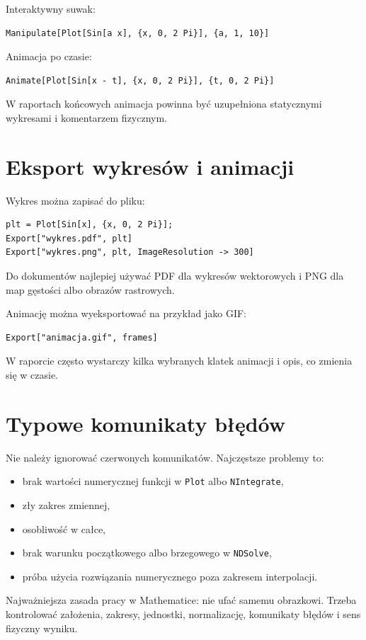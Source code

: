 Interaktywny suwak:
\begin{verbatim}
Manipulate[Plot[Sin[a x], {x, 0, 2 Pi}], {a, 1, 10}]
\end{verbatim}
Animacja po czasie:
\begin{verbatim}
Animate[Plot[Sin[x - t], {x, 0, 2 Pi}], {t, 0, 2 Pi}]
\end{verbatim}
W raportach końcowych animacja powinna być uzupełniona statycznymi wykresami i komentarzem fizycznym.

\section{Eksport wykresów i animacji}

Wykres można zapisać do pliku:
\begin{verbatim}
plt = Plot[Sin[x], {x, 0, 2 Pi}];
Export["wykres.pdf", plt]
Export["wykres.png", plt, ImageResolution -> 300]
\end{verbatim}
Do dokumentów najlepiej używać PDF dla wykresów wektorowych i PNG dla map gęstości albo obrazów rastrowych.

Animację można wyeksportować na przykład jako GIF:
\begin{verbatim}
Export["animacja.gif", frames]
\end{verbatim}
W raporcie często wystarczy kilka wybranych klatek animacji i opis, co zmienia się w czasie.

\section{Typowe komunikaty błędów}

Nie należy ignorować czerwonych komunikatów. Najczęstsze problemy to:
\begin{itemize}
    \item brak wartości numerycznej funkcji w \texttt{Plot} albo \texttt{NIntegrate},
    \item zły zakres zmiennej,
    \item osobliwość w całce,
    \item brak warunku początkowego albo brzegowego w \texttt{NDSolve},
    \item próba użycia rozwiązania numerycznego poza zakresem interpolacji.
\end{itemize}

\begin{summarybox}
Najważniejsza zasada pracy w Mathematice: nie ufać samemu obrazkowi. Trzeba kontrolować założenia, zakresy, jednostki, normalizację, komunikaty błędów i sens fizyczny wyniku.
\end{summarybox}
